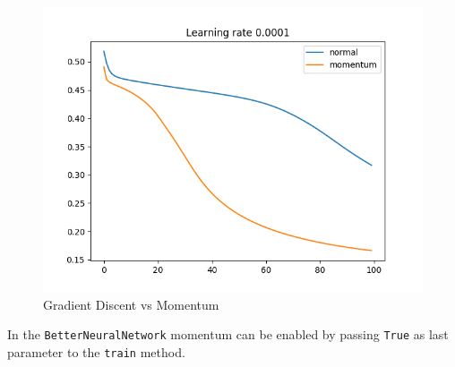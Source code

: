 \documentclass[11pt]{article}
\begin{document}
\begin{figure}[H]
\includegraphics[scale=0.35]{images/momentum_plot_0,0001.png}	
\caption{Gradient Discent vs Momentum}
\end{figure}
In the \texttt{BetterNeuralNetwork} momentum can be enabled by passing \texttt{True} as last parameter to the \texttt{train} method.
\end{document}
